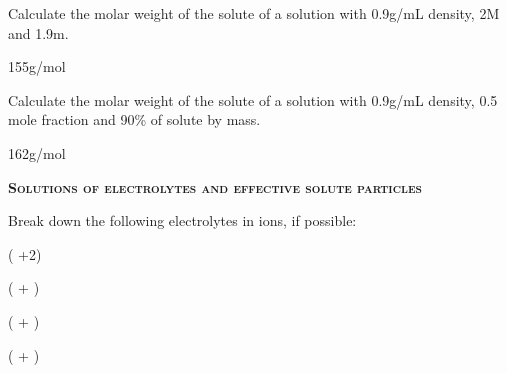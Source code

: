 \documentclass[main.tex]{subfiles}
\begin{document}
\begin{multicols*}{2}
\begin{question}[ID=\the\value{numA}]
Calculate the molar weight of the solute of a solution with 0.9g/mL density, 2M and 1.9m.\end{question}
\begin{solution}
155g/mol
\hspace{0.1cm}\end{solution}%

\begin{question}[ID=\the\value{numA}]
Calculate the molar weight of the solute of a solution with 0.9g/mL density, 0.5 mole fraction and 90\% of solute by mass.\end{question}
\begin{solution}
162g/mol
\hspace{0.1cm}\end{solution}%


{\raggedright\textsc{\textbf{Solutions of electrolytes and effective solute particles }}\par}


\begin{question}[ID=\the\value{numA}]
Break down the following electrolytes in ions, if possible:
\begin{inparaenum}[(a)]
\item  {}  %
\item   {}  %
\item   {}  %
\item   {}  %
\end{inparaenum}
\end{question}
\begin{solution}
\begin{inparaenum}[(a)]
\item  {}    (  +2)
\item   {}    (  + )
\item   {}    (  + )
\item   {}    (  + )
 \end{inparaenum}\hspace{0.1cm}\end{solution}%



\end{multicols*}
\end{document}
